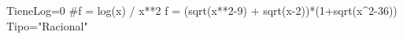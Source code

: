 \begin{sagesilent}
TieneLog=0
#f = log(x) / x**2
f = (sqrt(x**2-9) + sqrt(x-2))*(1+sqrt(x^2-36))
Tipo="Racional"
\end{sagesilent}
